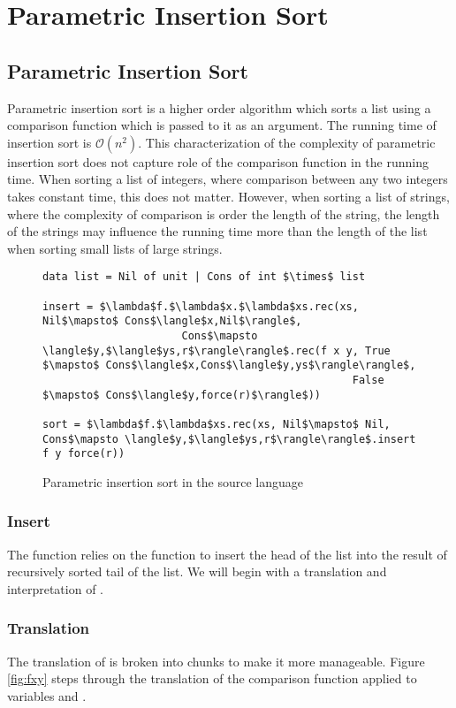 \section{Parametric Insertion Sort}

\subsection{Parametric Insertion Sort}
Parametric insertion sort is a higher order algorithm which sorts a list using a comparison function which is passed to it as an argument.
The running time of insertion sort is $\mathcal{O}(n^2)$.
This characterization of the complexity of parametric insertion sort does not capture role of the comparison function in the running time.
When sorting a list of integers, where comparison between any two integers takes constant time, this does not matter.
However, when sorting a list of strings, where the complexity of comparison is order the length of the string, the length of the strings may influence the running time more than the length of the list when sorting small lists of large strings.

\begin{figure}[H]
\caption{Parametric insertion sort in the source language}
\begin{lstlisting}
data list = Nil of unit | Cons of int $\times$ list

insert = $\lambda$f.$\lambda$x.$\lambda$xs.rec(xs, Nil$\mapsto$ Cons$\langle$x,Nil$\rangle$,
                      Cons$\mapsto \langle$y,$\langle$ys,r$\rangle\rangle$.rec(f x y, True $\mapsto$ Cons$\langle$x,Cons$\langle$y,ys$\rangle\rangle$,
                                                 False $\mapsto$ Cons$\langle$y,force(r)$\rangle$))

sort = $\lambda$f.$\lambda$xs.rec(xs, Nil$\mapsto$ Nil, Cons$\mapsto \langle$y,$\langle$ys,r$\rangle\rangle$.insert f y force(r))
\end{lstlisting}
\end{figure}

\subsubsection{Insert}
The function  relies on the function  to insert the head of the list into the result of recursively sorted tail of the list.
We will begin with a translation and interpretation of .

\subsubsection{Translation}
The translation of  is broken into chunks to make it more manageable.
Figure \ref{fig:fxy} steps through the translation of the comparison function  applied to variables  and .

